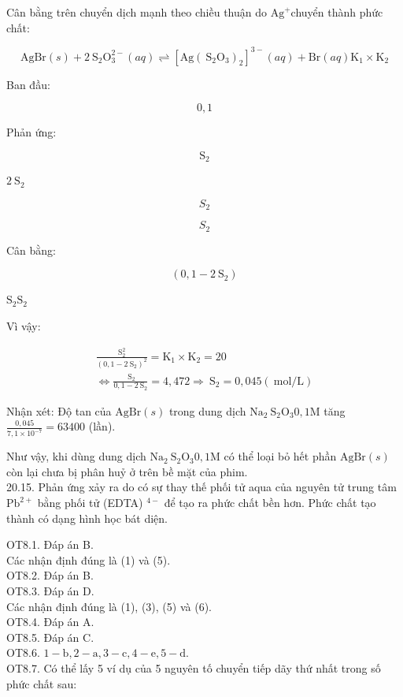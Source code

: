 \documentclass[10pt]{article}
\begin{document}
Cân bằng trên chuyển dịch mạnh theo chiều thuận do $\mathrm{Ag}^{+}$chuyển thành phức chất:

$$
\mathrm{AgBr}(s)+2 \mathrm{~S}_{2} \mathrm{O}_{3}^{2-}(a q) \rightleftharpoons\left[\mathrm{Ag}\left(\mathrm{~S}_{2} \mathrm{O}_{3}\right)_{2}\right]^{3-}(a q)+\mathrm{Br}(a q) \mathrm{K}_{1} \times \mathrm{K}_{2}
$$

Ban đầu:

$$
0,1
$$

Phản ứng:

$$
\mathrm{S}_{2}
$$

$2 \mathrm{~S}_{2}$

$$
S_{2}
$$

$$
S_{2}
$$

Cân bằng:

$$
\left(0,1-2 \mathrm{~S}_{2}\right)
$$

$\mathrm{S}_{2} \mathrm{S}_{2}$

Vì vậy:

$$
\begin{gathered}
\frac{\mathrm{S}_{2}^{2}}{\left(0,1-2 \mathrm{~S}_{2}\right)^{2}}=\mathrm{K}_{1} \times \mathrm{K}_{2}=20 \\
\Leftrightarrow \frac{\mathrm{~S}_{2}}{0,1-2 \mathrm{~S}_{2}}=4,472 \Rightarrow \mathrm{~S}_{2}=0,045(\mathrm{~mol} / \mathrm{L})
\end{gathered}
$$

Nhận xét: Độ tan của $\mathrm{AgBr}(s)$ trong dung dịch $\mathrm{Na}_{2} \mathrm{~S}_{2} \mathrm{O}_{3} 0,1 \mathrm{M}$ tăng $\frac{0,045}{7,1 \times 10^{-7}}=63400$ (lần).

Như vậy, khi dùng dung dịch $\mathrm{Na}_{2} \mathrm{~S}_{2} \mathrm{O}_{3} 0,1 \mathrm{M}$ có thể loại bỏ hết phần $\mathrm{AgBr}(s)$ còn lại chưa bị phân huỷ ở trên bề mặt của phim.\\
20.15. Phản ứng xảy ra do có sự thay thế phối tử aqua của nguyên tử trung tâm $\mathrm{Pb}^{2+}$ bằng phối tử (EDTA) ${ }^{4-}$ để tạo ra phức chất bền hơn. Phức chất tạo thành có dạng hình học bát diện.

OT8.1. Đáp án B.\\
Các nhận định đúng là (1) và (5).\\
OT8.2. Đáp án B.\\
OT8.3. Đáp án D.\\
Các nhận định đúng là (1), (3), (5) và (6).\\
OT8.4. Đáp án A.\\
OT8.5. Đáp án C.\\
OT8.6. $1-\mathrm{b}, 2-\mathrm{a}, 3-\mathrm{c}, 4-\mathrm{e}, 5-\mathrm{d}$.\\
OT8.7. Có thể lấy 5 ví dụ của 5 nguyên tố chuyển tiếp dãy thứ nhất trong số phức chất sau:
\end{document}
